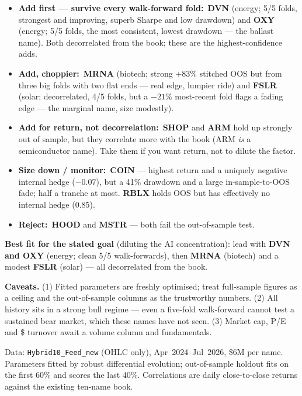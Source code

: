 \documentclass[11pt]{article}
\newcommand{\kpi}[2]{\textbf{#1}\,{\footnotesize\color{bcgrey}#2}}
\begin{document}
\begin{itemize}[leftmargin=1.4em,itemsep=2pt]
  \item \kpi{Add first --- survive every walk-forward fold:}{} \textbf{DVN} (energy; 5/5 folds,
        strongest and improving, superb Sharpe and low drawdown) and \textbf{OXY} (energy; 5/5
        folds, the most consistent, lowest drawdown --- the ballast name). Both decorrelated from
        the book; these are the highest-confidence adds.
  \item \kpi{Add, choppier:}{} \textbf{MRNA} (biotech; strong $+83\%$ stitched OOS but from three
        big folds with two flat ends --- real edge, lumpier ride) and \textbf{FSLR} (solar;
        decorrelated, 4/5 folds, but a $-21\%$ most-recent fold flags a fading edge --- the
        marginal name, size modestly).
  \item \kpi{Add for return, not decorrelation:}{} \textbf{SHOP} and \textbf{ARM} hold up
        strongly out of sample, but they correlate more with the book (ARM \emph{is} a
        semiconductor name). Take them if you want return, not to dilute the factor.
  \item \kpi{Size down / monitor:}{} \textbf{COIN} --- highest return and a uniquely negative
        internal hedge ($-0.07$), but a 41\% drawdown and a large in-sample-to-OOS fade; half a
        tranche at most. \textbf{RBLX} holds OOS but has effectively no internal hedge (0.85).
  \item \kpi{Reject:}{} \textbf{HOOD} and \textbf{MSTR} --- both fail the out-of-sample test.
\end{itemize}

\textbf{Best fit for the stated goal} (diluting the AI concentration): lead with \textbf{DVN and
OXY} (energy; clean 5/5 walk-forwards), then \textbf{MRNA} (biotech) and a modest \textbf{FSLR}
(solar) --- all decorrelated from the book.

\textbf{Caveats.} (1) Fitted parameters are freshly optimised; treat full-sample figures as a
ceiling and the out-of-sample columns as the trustworthy numbers. (2) All history sits in a
strong bull regime --- even a five-fold walk-forward cannot test a sustained bear market, which
these names have not seen. (3) Market cap, P/E and \$ turnover await a volume column and
fundamentals.

\vfill
{\footnotesize\color{bcgrey} Data: \texttt{Hybrid10\_Feed\_new} (OHLC only), Apr~2024--Jul~2026,
\$6M per name. Parameters fitted by robust differential evolution; out-of-sample holdout fits on
the first 60\% and scores the last 40\%. Correlations are daily close-to-close returns against
the existing ten-name book.}
\end{document}
